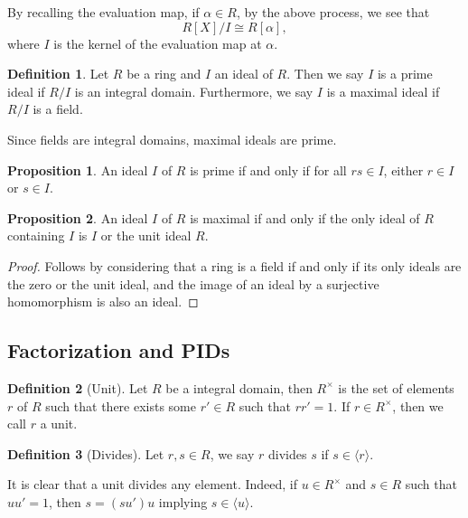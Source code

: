 \documentclass[]{article}
\theoremstyle{definition}
\theoremstyle{definition}
\newtheorem{definition}{Definition}[section]
\newtheorem{proposition}{Proposition}[section]
\begin{document}
By recalling the evaluation map, if \(\alpha \in R\), by the above process, we 
see that 
\[R[X] / I \cong R[\alpha],\]
where \(I\) is the kernel of the evaluation map at \(\alpha\).

\begin{definition}
  Let \(R\) be a ring and \(I\) an ideal of \(R\). Then we say \(I\) is a 
  prime ideal if \(R / I\) is an integral domain. Furthermore, we say 
  \(I\) is a maximal ideal if \(R / I\) is a field.
\end{definition}

Since fields are integral domains, maximal ideals are prime.

\begin{proposition}
  An ideal \(I\) of \(R\) is prime if and only if for all \(rs \in I\), either 
  \(r \in I\) or \(s \in I\).
\end{proposition}

\begin{proposition}
  An ideal \(I\) of \(R\) is maximal if and only if the only ideal of \(R\) 
  containing \(I\) is \(I\) or the unit ideal \(R\).
\end{proposition}
\begin{proof}
  Follows by considering that a ring is a field if and only if its only ideals 
  are the zero or the unit ideal, and the image of an ideal by a surjective 
  homomorphism is also an ideal.
\end{proof}

\subsection{Factorization and PIDs}

\begin{definition}[Unit]
  Let \(R\) be a integral domain, then \(R^\times\) is the set of elements \(r\) 
  of \(R\) such that there exists some \(r' \in R\) such that \(rr' = 1\). If 
  \(r \in R^\times\), then we call \(r\) a unit.
\end{definition}

\begin{definition}[Divides]
  Let \(r, s \in R\), we say \(r\) divides \(s\) if \(s \in \langle r \rangle\).
\end{definition}

It is clear that a unit divides any element. Indeed, if \(u \in R^\times\) 
and \(s \in R\) such that \(uu' = 1\), then \(s = (su')u\) implying 
\(s \in \langle u \rangle\).
\end{document}
